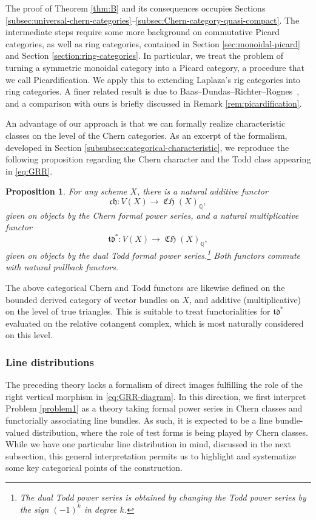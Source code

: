 \documentclass[JEP,XML,SOM,Unicode,published]{cedram}
\theoremstyle{plain}
\newtheorem{prop}[thm]{Proposition}
\theoremstyle{definition}
\newcommand{\QBbb}{\mathbb Q}
\newcommand{\chfrak}{\mathfrak {ch}}
\newcommand{\tdfrak}{\mathfrak {td}}
\DeclareMathOperator{\CHfrak}{\mathfrak{CH}}
\begin{document}
The proof of Theorem \ref{thm:B} and its consequences occupies Sections \ref{subsec:universal-chern-categories}--\ref{subsec:Chern-category-quasi-compact}. The intermediate steps require some more background on commutative Picard categories, as well as ring categories, contained in Section \ref{sec:monoidal-picard} and Section \ref{section:ring-categories}. In particular, we treat the problem of turning a symmetric monoidal category into a Picard category, a procedure that we call Picardification. We apply this to extending Laplaza's rig categories \cite{Laplaza} into ring categories. A finer related result is due to Baas--Dundas--Richter--Rognes~\cite{BDRR}, and a comparison with ours is briefly discussed in Remark \ref{rem:picardification}.

An advantage of our approach is that we can formally realize characteristic classes on the level of the Chern categories. As an excerpt of the formalism, developed in Section \ref{subsubsec:categorical-characteristic}, we reproduce the following proposition regarding the Chern character and the Todd class appearing in \eqref{eq:GRR}.

\begin{prop}\label{propB}
For any scheme $X$, there is a natural additive functor
\begin{displaymath}
\chfrak : V(X) \to \CHfrak(X)_\QBbb,
\end{displaymath}
given on objects by the Chern formal power series, and a natural multiplicative functor
\begin{displaymath}
\tdfrak^{\ast} : V(X) \to \CHfrak(X)_\QBbb,
\end{displaymath}
given on objects by the dual Todd formal power series.\footnote{The dual Todd power series is obtained by changing the Todd power series by the sign $(-1)^{k}$ in degree $k$.} Both functors commute with natural pullback functors.

\end{prop}
The above categorical Chern and Todd functors are likewise defined on the bounded derived category of vector bundles on $X$, and additive (\resp multiplicative) on the level of true triangles. This is suitable to treat functorialities for $\tdfrak^{\ast}$ evaluated on the relative cotangent complex, which is most naturally considered on this level.

\subsubsection*{Line distributions}
The preceding theory lacks a formalism of direct images fulfilling the role of the right vertical morphism in \eqref{eq:GRR-diagram}. In this direction, we first interpret Problem \ref{problem1} as a theory taking formal power series in Chern classes and functorially associating line bundles. As such, it is expected to be a line bundle-valued distribution, where the role of test forms is being played by Chern classes. While we have one particular line distribution in mind, discussed in the next subsection, this general interpretation permits us to highlight and systematize some key categorical points of the construction.
\end{document}

